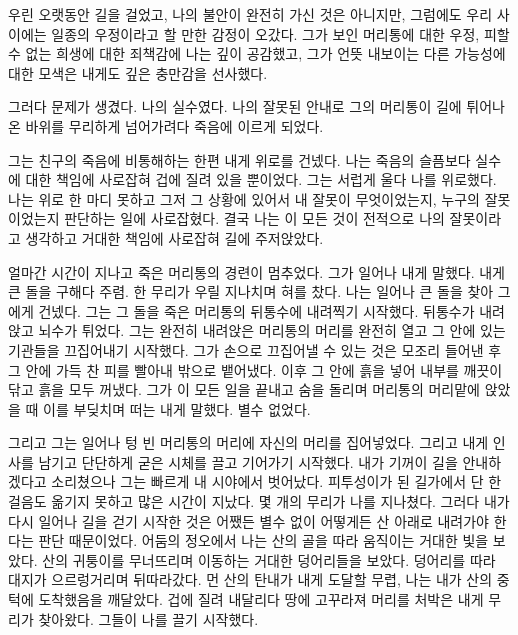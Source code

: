 \documentclass[12pt, b6paper, openany]{memoir}
\newenvironment{article}{}{}
\begin{document}
\begin{article}
우린 오랫동안 길을 걸었고, 나의 불안이 완전히 가신 것은 아니지만, 그럼에도 우리 사이에는 일종의 우정이라고 할 만한 감정이 오갔다. 그가 보인 머리통에 대한 우정, 피할 수 없는 희생에 대한 죄책감에 나는 깊이 공감했고, 그가 언뜻 내보이는 다른 가능성에 대한 모색은 내게도 깊은 충만감을 선사했다.

그러다 문제가 생겼다. 나의 실수였다. 나의 잘못된 안내로 그의 머리통이 길에 튀어나온 바위를 무리하게 넘어가려다 죽음에 이르게 되었다.

그는 친구의 죽음에 비통해하는 한편 내게 위로를 건넸다. 나는 죽음의 슬픔보다 실수에 대한 책임에 사로잡혀 겁에 질려 있을 뿐이었다. 그는 서럽게 울다 나를 위로했다. 나는 위로 한 마디 못하고 그저 그 상황에 있어서 내 잘못이 무엇이었는지, 누구의 잘못이었는지 판단하는 일에 사로잡혔다. 결국 나는 이 모든 것이 전적으로 나의 잘못이라고 생각하고 거대한 책임에 사로잡혀 길에 주저앉았다.

얼마간 시간이 지나고 죽은 머리통의 경련이 멈추었다. 그가 일어나 내게 말했다. 내게 큰 돌을 구해다 주렴. 한 무리가 우릴 지나치며 혀를 찼다. 나는 일어나 큰 돌을 찾아 그에게 건넸다. 그는 그 돌을 죽은 머리통의 뒤통수에 내려찍기 시작했다. 뒤통수가 내려앉고 뇌수가 튀었다. 그는 완전히 내려앉은 머리통의 머리를 완전히 열고 그 안에 있는 기관들을 끄집어내기 시작했다. 그가 손으로 끄집어낼 수 있는 것은 모조리 들어낸 후 그 안에 가득 찬 피를 빨아내 밖으로 뱉어냈다. 이후 그 안에 흙을 넣어 내부를 깨끗이 닦고 흙을 모두 꺼냈다. 그가 이 모든 일을 끝내고 숨을 돌리며 머리통의 머리맡에 앉았을 때 이를 부딪치며 떠는 내게 말했다. 별수 없었다.

그리고 그는 일어나 텅 빈 머리통의 머리에 자신의 머리를 집어넣었다. 그리고 내게 인사를 남기고 단단하게 굳은 시체를 끌고 기어가기 시작했다. 내가 기꺼이 길을 안내하겠다고 소리쳤으나 그는 빠르게 내 시야에서 벗어났다. 피투성이가 된 길가에서 단 한 걸음도 옮기지 못하고 많은 시간이 지났다. 몇 개의 무리가 나를 지나쳤다. 그러다 내가 다시 일어나 길을 걷기 시작한 것은 어쨌든 별수 없이 어떻게든 산 아래로 내려가야 한다는 판단 때문이었다. 어둠의 정오에서 나는 산의 골을 따라 움직이는 거대한 빛을 보았다. 산의 귀퉁이를 무너뜨리며 이동하는 거대한 덩어리들을 보았다. 덩어리를 따라 대지가 으르렁거리며 뒤따라갔다. 먼 산의 탄내가 내게 도달할 무렵, 나는 내가 산의 중턱에 도착했음을 깨달았다. 겁에 질려 내달리다 땅에 고꾸라져 머리를 처박은 내게 무리가 찾아왔다. 그들이 나를 끌기 시작했다.
\end{article}
\end{document}
